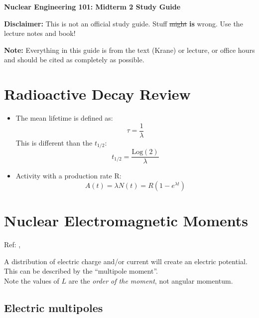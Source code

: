\documentclass[letter]{article}
\begin{document}
\textbf{\Large{Nuclear Engineering 101: Midterm 2 Study Guide}} \\
\vspace{12pt}

\textbf{Disclaimer:} This is not an official study guide. Stuff \sout{might}
\textbf{is} wrong. Use the lecture notes and book!
\vspace{10pt}

\textbf{Note:} Everything in this guide is from the text (Krane) or
lecture, or office hours and should be cited as completely as
possible.

\section{Radioactive Decay Review}

\begin{itemize}
\item The mean lifetime is defined as:
  \begin{equation*}
    \tau = \frac{1}{\lambda}
  \end{equation*}
This is different than the $t_{1/2}$:
\begin{equation*}
  t_{1/2}=\frac{\text{Log}(2)}{\lambda}
\end{equation*}
\item Activity with a production rate R:
  \begin{equation*}
    A(t)=\lambda{}N(t)=R(1-e^{\lambda{}t})
  \end{equation*}
\end{itemize}

\section{Nuclear Electromagnetic Moments}

Ref: \cite[pp. 71-75]{krane},\cite[Lec 10]{lecture}

A distribution of electric charge and/or current will create an
electric potential. This can be described by the ``multipole
moment''. \\

Note the values of $L$ are the \textit{order of the moment}, not
angular momentum.

\subsection{Electric multipoles}
\end{document}
